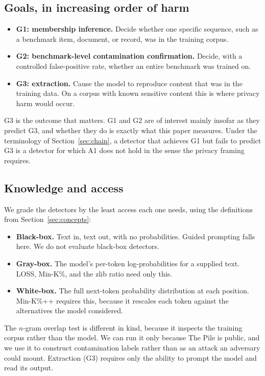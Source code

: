 \subsection{Goals, in increasing order of harm}
\begin{itemize}
 \item \textbf{G1: membership inference.} Decide whether one specific sequence, such as a
 benchmark item, document, or record, was in the training corpus.
 \item \textbf{G2: benchmark-level contamination confirmation.} Decide, with a controlled
 false-positive rate, whether an entire benchmark was trained on.
 \item \textbf{G3: extraction.} Cause the model to reproduce content that was in the
 training data. On a corpus with known sensitive content this is where privacy harm would
 occur.
\end{itemize}

G3 is the outcome that matters. G1 and G2 are of interest mainly insofar as they predict
G3, and whether they do is exactly what this paper measures. Under the terminology of
Section~\ref{sec:chain}, a detector that achieves G1 but fails to predict G3 is a
detector for which A1 does not hold in the sense the privacy framing requires.

\subsection{Knowledge and access}
We grade the detectors by the least access each one needs, using the definitions from
Section~\ref{sec:concepts}:

\begin{itemize}
 \item \textbf{Black-box.} Text in, text out, with no probabilities. Guided prompting
 falls here. We do not evaluate black-box detectors.
 \item \textbf{Gray-box.} The model's per-token log-probabilities for a supplied text.
 LOSS, Min-K\%, and the zlib ratio need only this.
 \item \textbf{White-box.} The full next-token probability distribution at each position.
 Min-K\%++ requires this, because it rescales each token against the alternatives the
 model considered.
\end{itemize}

The $n$-gram overlap test is different in kind, because it inspects the training corpus
rather than the model. We can run it only because The Pile is public, and we use it to
construct contamination labels rather than as an attack an adversary could mount.
Extraction (G3) requires only the ability to prompt the model and read its output.


